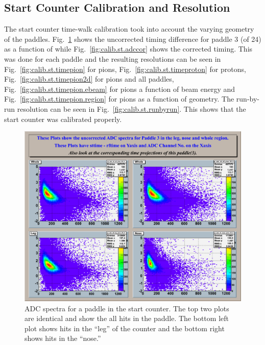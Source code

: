\subsection{\label{sec:calib.st}Start Counter Calibration and Resolution}

The start counter time-walk calibration took into account the varying geometry of the paddles. Fig.~\ref{fig:calib.st.adcuncor} shows the uncorrected timing difference for paddle 3 (of 24) as a function of  while Fig.~\ref{fig:calib.st.adccor} shows the corrected timing. This was done for each paddle and the resulting resolutions can be seen in Fig.~\ref{fig:calib.st.timepion} for pions, Fig.~\ref{fig:calib.st.timeproton} for protons, Fig.~\ref{fig:calib.st.timepion2d} for pions and all paddles, Fig.~\ref{fig:calib.st.timepion.ebeam} for pions a function of beam energy and Fig.~\ref{fig:calib.st.timepion.region} for pions as a function of geometry. The run-by-run resolution can be seen in Fig.~\ref{fig:calib.st.runbyrun}. This shows that the start counter was calibrated properly.

\begin{figure}[htbp]\begin{center}
\includegraphics[width=0.65\columnwidth]{figures/calib/st/Uncorrected_adc.eps}
\caption[]{\label{fig:calib.st.adcuncor}ADC spectra for a paddle in the start counter. The top two plots are identical and show the all hits in the paddle. The bottom left plot shows hits in the ``leg'' of the counter and the bottom right shows hits in the ``nose.''}
\end{center}\end{figure}

